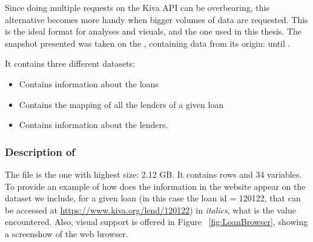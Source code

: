 Since doing multiple requests on the Kiva API can be overbearing, this alternative becomes more handy when bigger volumes of data are requested. This is the ideal format for analyses and visuals, and the one used in this thesis. The snapshot presented was taken on the , containing data from its origin:  until .

It contains three different datasets:

\begin{itemize}
\item {} Contains information about the loans
\item {} Contains the mapping of all the lenders of a given loan
\item {} Contains information about the lenders.
\end{itemize}

\subsubsection{Description of } \label{loans_description}
The  file is the one with highest size: 2.12 GB. It contains  rows and 34 variables. To provide an example of how does the information in the website appear on the dataset we include, for a given loan (in this case the loan id = 120122, that can be accessed at \url{https://www.kiva.org/lend/120122}) in \textit{italics}, what is the value encountered. Also, visual support is offered in Figure ~\ref{fig:LoanBrowser}, showing a screenshow of the web browser.

